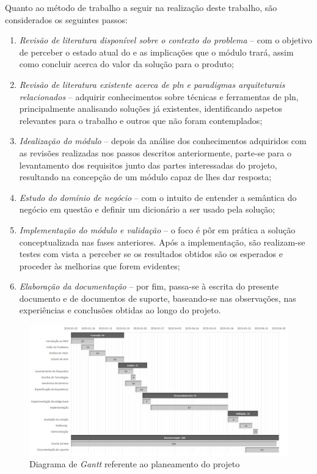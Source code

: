 Quanto ao método de trabalho a seguir na realização deste trabalho, são considerados os seguintes passos:

\begin{enumerate}
    \item 
    {
        \textit{Revisão de literatura disponível sobre o contexto do problema} -- com o objetivo de perceber o estado atual do {\productname} e as implicações que o módulo trará, assim como concluir acerca do valor da solução para o produto;
    }
    \item
    {
        \textit{Revisão de literatura existente acerca de \gls{pln} e paradigmas arquiteturais relacionados} -- adquirir conhecimentos sobre técnicas e ferramentas de \gls{pln}, principalmente analisando soluções já existentes, identificando aspetos relevantes para o trabalho e outros que não foram contemplados;
    }
    \item
    {
        \textit{Idealização do módulo} -- depois da análise dos conhecimentos adquiridos com as revisões realizadas nos passos descritos anteriormente, parte-se para o levantamento dos requisitos junto das partes interessadas do projeto, resultando na concepção de um módulo capaz de lhes dar resposta; 
    }
    \item
    {
        \textit{Estudo do domínio de negócio} -- com o intuito de entender a semântica do negócio em questão e definir um dicionário a ser usado pela solução;
    }
    \item
    {
        \textit{Implementação do módulo e validação} -- o foco é pôr em prática a solução conceptualizada nas fases anteriores. Após a implementação, são realizam-se testes com vista a perceber se os resultados obtidos são os esperados e proceder às melhorias que forem evidentes;
    }
    \item
    {
        \textit{Elaboração da documentação} --  por fim, passa-se à escrita do presente documento e de documentos de suporte, baseando-se nas observações, nas experiências e conclusões obtidas ao longo do projeto.
    }
\end{enumerate}

\clearpage
\begin{figure}
    \centering
    \includegraphics[width=1.0\textwidth]{pre-thesis/assets/gantt.jpg}
    \caption{Diagrama de \textit{Gantt} referente ao planeamento do projeto}
    \label{fig:planning-gantt_chart}
\end{figure}
\clearpage
